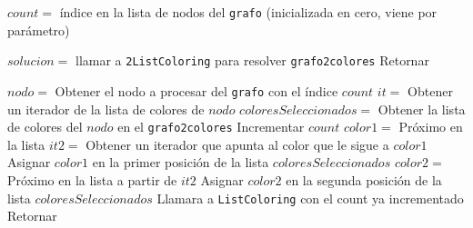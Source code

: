 \begin{algorithmic} 

\STATE $count = $ índice en la lista de nodos del \texttt{grafo} (inicializada en cero, viene por parámetro) 

	\STATE $solucion = $ llamar a \texttt{2ListColoring} para resolver \texttt{grafo2colores} 
	\STATE Retornar 
\ENDIF

\STATE $nodo = $ Obtener el nodo a procesar del \texttt{grafo} con el índice $count$ 
\STATE $it = $ Obtener un iterador de la lista de colores de $nodo$ 
\STATE $coloresSeleccionados = $ Obtener la lista de colores del $nodo$ en el \texttt{grafo2colores} 
\STATE Incrementar $count$ 
	\STATE $color1 = $ Próximo en la lista 
	\STATE $it2 = $ Obtener un iterador que apunta al color que le sigue a $color1$ 
	\STATE Asignar $color1$ en la primer posición de la lista $coloresSeleccionados$ 
		\STATE $color2 = $ Próximo en la lista a partir de $it2$ 
		\STATE Asignar $color2$ en la segunda posición de la lista $coloresSeleccionados$ 
		\STATE Llamara a \texttt{ListColoring} con el count ya incrementado 
	\ENDWHILE
\ENDWHILE
\STATE Retornar
\end{algorithmic}


% 
% 

